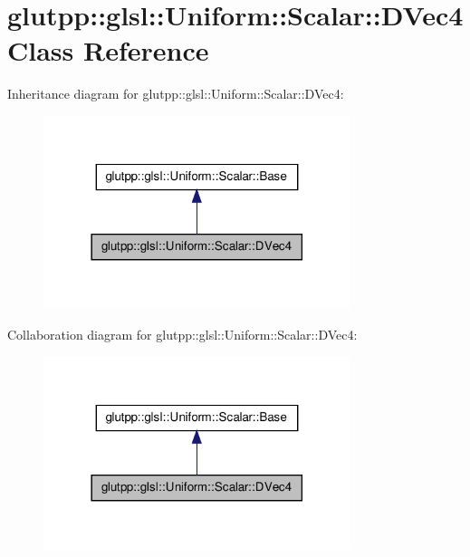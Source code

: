 \hypertarget{classglutpp_1_1glsl_1_1Uniform_1_1Scalar_1_1DVec4}{\section{glutpp\-:\-:glsl\-:\-:\-Uniform\-:\-:\-Scalar\-:\-:\-D\-Vec4 \-Class \-Reference}
\label{classglutpp_1_1glsl_1_1Uniform_1_1Scalar_1_1DVec4}
}


\-Inheritance diagram for glutpp\-:\-:glsl\-:\-:\-Uniform\-:\-:\-Scalar\-:\-:\-D\-Vec4\-:\nopagebreak
\begin{figure}[H]
\begin{center}
\leavevmode
\includegraphics[width=254pt]{classglutpp_1_1glsl_1_1Uniform_1_1Scalar_1_1DVec4__inherit__graph}
\end{center}
\end{figure}


\-Collaboration diagram for glutpp\-:\-:glsl\-:\-:\-Uniform\-:\-:\-Scalar\-:\-:\-D\-Vec4\-:\nopagebreak
\begin{figure}[H]
\begin{center}
\leavevmode
\includegraphics[width=254pt]{classglutpp_1_1glsl_1_1Uniform_1_1Scalar_1_1DVec4__coll__graph}
\end{center}
\end{figure}
